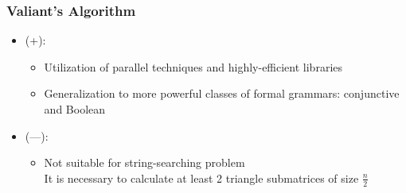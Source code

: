 \documentclass[xcolor=table]{beamer}
\begin{document}
\begin{frame}[fragile] \frametitle{Valiant's Algorithm}

    \begin{itemize}
    \item (+):
    \begin{itemize}
        \item Utilization of parallel techniques and highly-efficient libraries
        \item Generalization to more powerful classes of formal grammars: conjunctive and Boolean
    \end{itemize}
    \item (---):
    \begin{itemize}
      \item Not suitable for string-searching problem \\
      It is necessary to calculate at least 2 triangle submatrices of size $\frac{n}{2}$ 
    \end{itemize}
    \end{itemize}


\end{frame}
\end{document}
